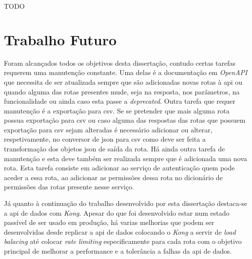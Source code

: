 TODO

\section{Trabalho Futuro}

Foram alcançados todos os objetivos desta dissertação, contudo certas tarefas requerem uma manutenção constante. Uma delas é a documentação em \textit{OpenAPI} que necessita de ser atualizada sempre que são adicionadas novas rotas à \acrshort{api} ou quando alguma das rotas presentes mude, seja na resposta, nos parâmetros, na funcionalidade ou ainda caso esta passe a \textit{deprecated}. Outra tarefa que requer manutenção é a exportação para \acrshort{csv}. Se se pretender que mais alguma rota possua exportação para \acrshort{csv} ou caso alguma das respostas das rotas que possuem exportação para \acrshort{csv} sejam alteradas é necessário adicionar ou alterar, respetivamente, no conversor de \acrshort{json} para \acrshort{csv} como deve ser feita a transformação dos objetos \acrshort{json} de saída da rota. Há ainda outra tarefa de manutenção e esta deve também ser realizada sempre que é adicionada uma nova rota. Esta tarefa consiste em adicionar ao serviço de autenticação quem pode aceder a essa rota, ao adicionar as permissões dessa rota no dicionário de permissões das rotas presente nesse serviço.

Já quanto à continuação do trabalho desenvolvido por esta dissertação destaca-se a \acrshort{api} de dados com \textit{Kong}. Apesar do que foi desenvolvido estar num estado passível de ser usado em produção, há varias melhorias que podem ser desenvolvidas desde replicar a \acrshort{api} de dados colocando o \textit{Kong} a servir de \textit{load balacing} até colocar \textit{rate limiting} especificamente para cada rota com o objetivo principal de melhorar a performance e a tolerância a falhas da \acrshort{api} de dados.
